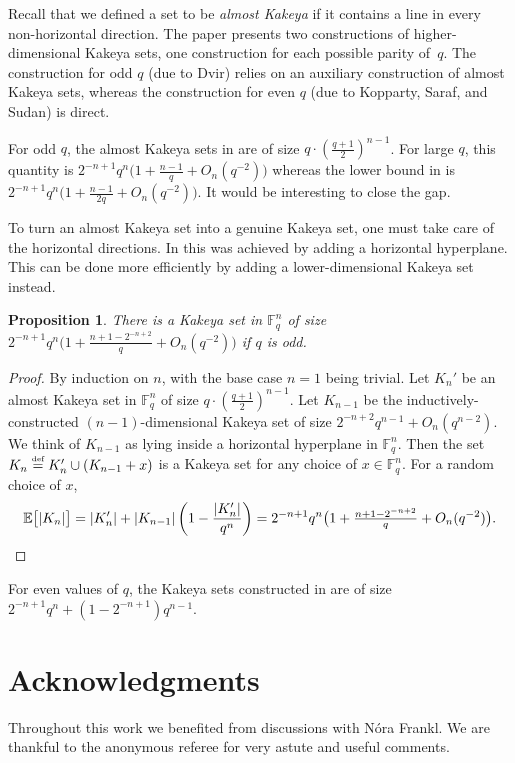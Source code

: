 \documentclass{daj}
\newtheorem{proposition}[theorem]{Proposition}
\theoremstyle{definition}
\newcommand*{\eqdef}{\stackrel{\mbox{\normalfont\tiny def}}{=}}   %
\newcommand*{\E}{\mathbb{E}}                                     %
\newcommand*{\Fq}{\mathbb{F}_q}                                  %
\DeclarePairedDelimiter\abs{\lvert}{\rvert}                     %
\begin{document}
Recall that we defined a set to be \emph{almost Kakeya} if it contains a line in every non-horizontal direction.
The paper \cite{saraf_sudan} presents two constructions of higher-dimensional Kakeya sets, one construction 
for each possible parity of~$q$. The construction for odd $q$ (due to Dvir) relies on an auxiliary construction
of almost Kakeya sets, whereas the construction for even $q$ (due to Kopparty, Saraf, and Sudan)
is direct.

For odd $q$, the almost Kakeya sets in \cite{saraf_sudan} are of size $q\cdot (\frac{q+1}{2})^{n-1}$.
For large $q$, this quantity is $2^{-n+1}q^n\bigl(1+\frac{n-1}{q}+O_n(q^{-2})\bigr)$ whereas
the lower bound in  is $2^{-n+1}q^n\bigl(1+\frac{n-1}{2q}+O_n(q^{-2})\bigr)$.
It would be interesting to close the gap.

To turn an almost Kakeya set into a genuine Kakeya set, one must
take care of the horizontal directions. In \cite{saraf_sudan} this was
achieved by adding a horizontal hyperplane. This can be done
more efficiently by adding a lower-dimensional Kakeya set instead.
\begin{proposition}
  There is a Kakeya set in $\Fq^n$ of size $2^{-n+1}q^n\bigl(1+\tfrac{n+1-2^{-n+2}}{q}+O_n(q^{-2})\bigr)$ if $q$ is odd.
\end{proposition}
\begin{proof}
  By induction on $n$, with the base case $n=1$ being trivial. Let $K_n'$ be an
  almost Kakeya set in $\Fq^n$ of size $q\cdot (\frac{q+1}{2})^{n-1}$.
  Let $K_{n-1}$ be the inductively-constructed $(n-1)$-dimensional Kakeya set
  of size $2^{-n+2}q^{n-1}+O_n(q^{n-2})$. We think of $K_{n-1}$ as lying inside a horizontal
  hyperplane in $\Fq^n$. Then the set $K_n\eqdef K_n'\cup (K_{n-1}+x)$ is a Kakeya set
  for any choice of $x\in \Fq^n$. For a random choice of $x$, 
  \[
  \E\bigl[\abs{K_n}\bigr]=\abs{K_n'}+\abs{K_{n-1}}\left(1-\frac{\abs{K_n'}}{q^n}\right)=2^{-n+1}q^n\bigl(1+\tfrac{n+1-2^{-n+2}}{q}+O_n(q^{-2})\bigr).\qedhere
  \]
\end{proof}

For even values of $q$, the Kakeya sets constructed in \cite{saraf_sudan} are of size 
$2^{-n+1}q^n+(1-2^{-n+1})q^{n-1}$.


\section*{Acknowledgments} %
Throughout this work we benefited from discussions with N\'ora Frankl.
We are thankful to the anonymous referee for very astute and useful comments.
\end{document}
